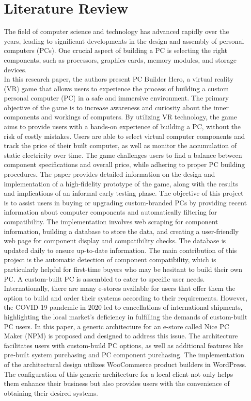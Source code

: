 \section{Literature Review}
The field of computer science and technology has advanced rapidly over the years, leading to significant developments in the design and assembly of personal computers (PCs). One crucial aspect of building a PC is selecting the right components, such as processors, graphics cards, memory modules, and storage devices.\\
In this research paper, the authors present PC Builder Hero, a virtual reality (VR) game that allows users to experience the process of building a custom personal computer (PC) in a safe and immersive environment. The primary objective of the game is to increase awareness and curiosity about the inner components and workings of computers. By utilizing VR technology, the game aims to provide users with a hands-on experience of building a PC, without the risk of costly mistakes. Users are able to select virtual computer components and track the price of their built computer, as well as monitor the accumulation of static electricity over time. The game challenges users to find a balance between component specifications and overall price, while adhering to proper PC building procedures. The paper provides detailed information on the design and implementation of a high-fidelity prototype of the game, along with the results and implications of an informal early testing phase\cite{slovikosky2019pc}.
The objective of this project is to assist users in buying or upgrading custom-branded PCs by providing recent information about computer components and automatically filtering for compatibility. The implementation involves web scraping for component information, building a database to store the data, and creating a user-friendly web page for component display and compatibility checks. The database is updated daily to ensure up-to-date information. The main contribution of this project is the automatic detection of component compatibility, which is particularly helpful for first-time buyers who may be hesitant to build their own PC\cite{romero2021implementing}.
A custom-built PC is assembled to cater to specific user needs. Internationally, there are many e-stores available for users that offer them the option to build and order their systems according to their requirements. However, the COVID-19 pandemic in 2020 led to cancellations of international shipments, highlighting the local market's deficiency in fulfilling the demands of custom-built PC users. In this paper, a generic architecture for an e-store called Nice PC Maker (NPM) is proposed and designed to address this issue. The architecture facilitates users with custom-build PC options, as well as additional features like pre-built system purchasing and PC component purchasing. The implementation of the architectural design utilizes WooCommerce product builders in WordPress. The configuration of this generic architecture for a local client not only helps them enhance their business but also provides users with the convenience of obtaining their desired systems\cite{khursheed2023nice}.